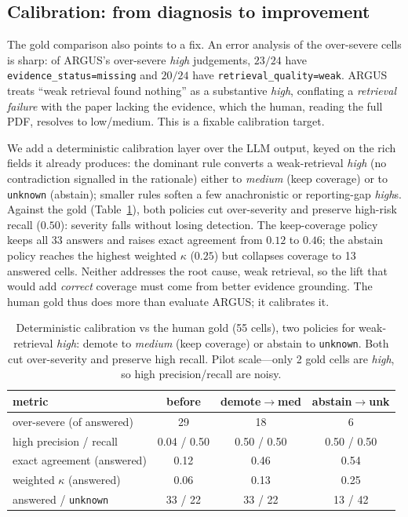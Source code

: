 \subsection{Calibration: from diagnosis to improvement}
\label{sec:calib}
The gold comparison also points to a fix. An error analysis of the
over-severe cells is sharp: of ARGUS's over-severe \emph{high} judgements,
$23/24$ have \texttt{evidence\_status=missing} and $20/24$ have
\texttt{retrieval\_quality=weak}. ARGUS treats ``weak retrieval found nothing'' as
a substantive \emph{high}, conflating a \emph{retrieval failure} with the paper
lacking the evidence, which the human, reading the full PDF, resolves to
low/medium. This is a fixable calibration target.

We add a deterministic calibration layer over the LLM output, keyed on the rich
fields it already produces: the dominant rule converts a weak-retrieval
\emph{high} (no contradiction signalled in the rationale) either to \emph{medium}
(keep coverage) or to \texttt{unknown} (abstain); smaller rules soften a few
anachronistic or reporting-gap \emph{high}s. Against the gold
(Table~\ref{tab:calib}), both policies cut over-severity and preserve high-risk
recall ($0.50$): severity falls without losing detection. The keep-coverage
policy keeps all 33 answers and raises exact agreement from $0.12$ to $0.46$; the
abstain policy reaches the highest weighted $\kappa$ ($0.25$) but collapses
coverage to 13 answered cells. Neither addresses the root cause, weak retrieval,
so the lift that would add \emph{correct} coverage must come from better evidence
grounding. The human gold thus does more than evaluate ARGUS; it calibrates it.

\begin{table}[t]
  \centering
  \caption{Deterministic calibration vs the human gold (55 cells), two policies
  for weak-retrieval \emph{high}: demote to \emph{medium} (keep coverage) or
  abstain to \texttt{unknown}. Both cut over-severity and preserve high recall.
  Pilot scale---only 2 gold cells are \emph{high}, so high precision/recall are
  noisy.}
  \label{tab:calib}
  \begin{tabular}{lccc}
    \toprule
    metric & before & demote$\to$med & abstain$\to$unk \\
    \midrule
    over-severe (of answered) & 29 & 18 & 6 \\
    high precision / recall   & 0.04 / 0.50 & 0.50 / 0.50 & 0.50 / 0.50 \\
    exact agreement (answered) & 0.12 & 0.46 & 0.54 \\
    weighted $\kappa$ (answered) & 0.06 & 0.13 & 0.25 \\
    answered / \texttt{unknown} & 33 / 22 & 33 / 22 & 13 / 42 \\
    \bottomrule
  \end{tabular}
\end{table}

